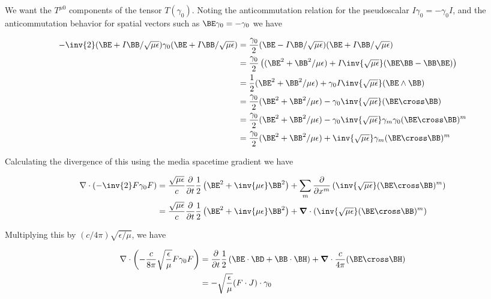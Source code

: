We want the $T^{\mu 0}$ components of the tensor $T(\gamma_0)$.  Noting the anticommutation relation for the pseudoscalar $I \gamma_0 = -\gamma_0 I$, and the anticommutation behavior for spatial vectors such as $\BE \gamma_0 = -\gamma_0$ we have

\begin{align*}
-\inv{2} (\BE + I\BB/\sqrt{\mu\epsilon}) \gamma_0 (\BE + I\BB/\sqrt{\mu\epsilon})
&=
\frac{\gamma_0}{2} (\BE - I\BB/\sqrt{\mu\epsilon}) (\BE + I\BB/\sqrt{\mu\epsilon}) \\
&=
\frac{\gamma_0}{2} \left( (\BE^2 + \BB^2/{\mu\epsilon}) + I \inv{\sqrt{\mu\epsilon}} (\BE\BB - \BB\BE) \right) \\
&=
\frac{1}{2} (\BE^2 + \BB^2/{\mu\epsilon}) + \gamma_0 I \inv{\sqrt{\mu\epsilon}} (\BE \wedge \BB) \\
&=
\frac{\gamma_0}{2} (\BE^2 + \BB^2/{\mu\epsilon}) - \gamma_0 \inv{\sqrt{\mu\epsilon}} (\BE \cross \BB) \\
&=
\frac{\gamma_0}{2} (\BE^2 + \BB^2/{\mu\epsilon}) - \gamma_0 \inv{\sqrt{\mu\epsilon}} \gamma_m \gamma_0 (\BE \cross \BB)^m \\
&=
\frac{\gamma_0}{2} (\BE^2 + \BB^2/{\mu\epsilon}) + \inv{\sqrt{\mu\epsilon}} \gamma_m (\BE \cross \BB)^m \\
\end{align*}

Calculating the divergence of this using the media spacetime gradient we have

\begin{align*}
\grad \cdot \left( -\inv{2} F \gamma_0 F \right)
&=
\frac{\sqrt{\mu\epsilon}}{c} \frac{\partial}{\partial t} \frac{1}{2} \left(\BE^2 + \inv{\mu\epsilon}\BB^2\right)
+ \sum_m
\frac{\partial}{\partial x^m} \left( \inv{\sqrt{\mu\epsilon}} (\BE \cross \BB)^m \right) \\
&=
\frac{\sqrt{\mu\epsilon}}{c} \frac{\partial}{\partial t} \frac{1}{2} \left(\BE^2 + \inv{\mu\epsilon}\BB^2 \right)
+ \spacegrad \cdot \left( \inv{\sqrt{\mu\epsilon}} (\BE \cross \BB)^m \right)
\end{align*}

Multiplying this by $(c/4\pi) \sqrt{\epsilon/\mu}$, we have

\begin{align*}
\grad \cdot \left( -\frac{c}{8 \pi} \sqrt{\frac{\epsilon}{\mu}} F \gamma_0 F \right)
&=
\frac{\partial}{\partial t} \frac{1}{2} \left(\BE \cdot \BD + \BB \cdot \BH \right) + \spacegrad \cdot \frac{c}{4\pi}(\BE \cross \BH) \\
&=
- \sqrt{\frac{\epsilon}{\mu}}(F \cdot J) \cdot \gamma_0 \\
\end{align*}

